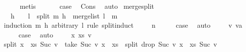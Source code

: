 \begin{isabellebody}
\ \ \ \ \isamarkupfalse%
\ metis\ \isanewline
\ \ \isamarkupfalse%
\ \isamarkupfalse%
\ {\isacharquery}{\kern0pt}case\ \isamarkupfalse%
\ Cons\ \isamarkupfalse%
\ auto\isanewline
{}\isamarkupfalse%
%
\endisatagproof
{\isafoldproof}%
%
\isadelimproof
\isanewline
%
\endisadelimproof
\isanewline
{}\isamarkupfalse%
\ merge{\isacharunderscore}{\kern0pt}split{\isacharcolon}{\kern0pt}\ \isanewline
\ \ \ {\isachardoublequoteopen}h\ {\isachargreater}{\kern0pt}\ {}\ {\isasymLongrightarrow}\ l\ {\isacharequal}{\kern0pt}\ {\isacharparenleft}{\kern0pt}split\ m\ h{\isacharparenright}{\kern0pt}\ {\isasymLongrightarrow}\ merge{\isacharunderscore}{\kern0pt}list\ l\ {\isacharequal}{\kern0pt}\ m{\isachardoublequoteclose}\ \isanewline
%
\isadelimproof
%
\endisadelimproof
%
\isatagproof
{}\isamarkupfalse%
\ {\isacharparenleft}{\kern0pt}induction\ m\ h\ arbitrary{\isacharcolon}{\kern0pt}\ l\ rule{\isacharcolon}{\kern0pt}\ split{\isachardot}{\kern0pt}induct{\isacharparenright}{\kern0pt}\isanewline
\ \ \isamarkupfalse%
\ {\isacharparenleft}{\kern0pt}{}\ n{\isacharparenright}{\kern0pt}\isanewline
\ \ \isamarkupfalse%
\ \isamarkupfalse%
\ {\isacharquery}{\kern0pt}case\ \isamarkupfalse%
\ auto\isanewline
{}\isamarkupfalse%
\isanewline
\ \ \isamarkupfalse%
\ {\isacharparenleft}{\kern0pt}{}\ v\ va{\isacharparenright}{\kern0pt}\isanewline
\ \ \isamarkupfalse%
\ \isamarkupfalse%
\ {\isacharquery}{\kern0pt}case\ \isamarkupfalse%
\ auto\isanewline
{}\isamarkupfalse%
\isanewline
\ \ \isamarkupfalse%
\ {\isacharparenleft}{\kern0pt}{}\ x\ xs\ v{\isacharparenright}{\kern0pt}\isanewline
\ \ \isamarkupfalse%
\ {\isachardoublequoteopen}split\ {\isacharparenleft}{\kern0pt}x\ {\isacharhash}{\kern0pt}\ xs{\isacharparenright}{\kern0pt}\ {\isacharparenleft}{\kern0pt}Suc\ v{\isacharparenright}{\kern0pt}\ {\isacharequal}{\kern0pt}\ {\isacharparenleft}{\kern0pt}take\ {\isacharparenleft}{\kern0pt}Suc\ v{\isacharparenright}{\kern0pt}\ {\isacharparenleft}{\kern0pt}x\ {\isacharhash}{\kern0pt}\ xs{\isacharparenright}{\kern0pt}{\isacharparenright}{\kern0pt}\ {\isacharhash}{\kern0pt}\ {\isacharparenleft}{\kern0pt}split\ {\isacharparenleft}{\kern0pt}drop\ {\isacharparenleft}{\kern0pt}Suc\ v{\isacharparenright}{\kern0pt}\ {\isacharparenleft}{\kern0pt}x\ {\isacharhash}{\kern0pt}\ xs{\isacharparenright}{\kern0pt}{\isacharparenright}{\kern0pt}\ {\isacharparenleft}{\kern0pt}Suc\ v{\isacharparenright}{\kern0pt}{\isacharparenright}{\kern0pt}{\isachardoublequoteclose}\isanewline

\end{isabellebody}
